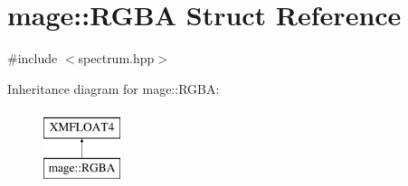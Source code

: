 \hypertarget{structmage_1_1_r_g_b_a}{}\section{mage\+:\+:R\+G\+BA Struct Reference}
\label{structmage_1_1_r_g_b_a}


{\ttfamily \#include $<$spectrum.\+hpp$>$}

Inheritance diagram for mage\+:\+:R\+G\+BA\+:\begin{figure}[H]
\begin{center}
\leavevmode
\includegraphics[height=2.000000cm]{structmage_1_1_r_g_b_a}
\end{center}
\end{figure}
